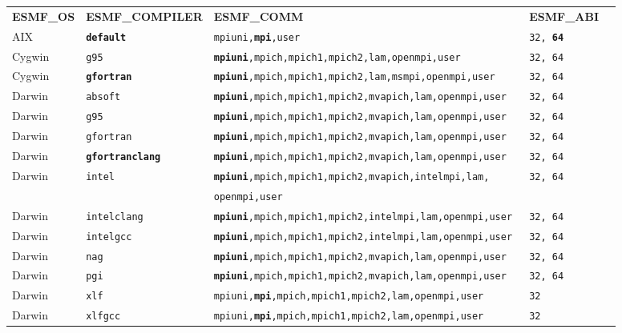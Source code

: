 \begin{longtable}{lllll}
  {\bfseries\footnotesize ESMF\_OS} &{\bfseries\footnotesize ESMF\_COMPILER} & {\bfseries\footnotesize ESMF\_COMM} & {\bfseries\footnotesize ESMF\_ABI} \\

AIX     &\tt {\bf default}        &\footnotesize \tt mpiuni,{\bf mpi},user      &\tt 32, {\bf 64} \\
Cygwin  &\tt g95                  &\footnotesize \tt {\bf mpiuni},mpich,mpich1,mpich2,lam,openmpi,user &\tt 32, 64 \\
Cygwin  &\tt {\bf gfortran}       &\footnotesize \tt {\bf mpiuni},mpich,mpich1,mpich2,lam,msmpi,openmpi,user &\tt 32, 64 \\
Darwin  &\tt absoft               &\footnotesize \tt {\bf mpiuni},mpich,mpich1,mpich2,mvapich,lam,openmpi,user &\tt 32, 64 \\
Darwin  &\tt g95                  &\footnotesize \tt {\bf mpiuni},mpich,mpich1,mpich2,mvapich,lam,openmpi,user &\tt 32, 64 \\
Darwin  &\tt gfortran             &\footnotesize \tt {\bf mpiuni},mpich,mpich1,mpich2,mvapich,lam,openmpi,user &\tt 32, 64 \\
Darwin  &\tt {\bf gfortranclang}  &\footnotesize \tt {\bf mpiuni},mpich,mpich1,mpich2,mvapich,lam,openmpi,user &\tt 32, 64 \\
Darwin  &\tt intel                &\footnotesize \tt {\bf mpiuni},mpich,mpich1,mpich2,mvapich,intelmpi,lam, &\tt 32, 64 \\
        &                         &\footnotesize \tt openmpi,user &  \\
Darwin  &\tt intelclang           &\footnotesize \tt {\bf mpiuni},mpich,mpich1,mpich2,intelmpi,lam,openmpi,user &\tt 32, 64 \\
Darwin  &\tt intelgcc             &\footnotesize \tt {\bf mpiuni},mpich,mpich1,mpich2,intelmpi,lam,openmpi,user &\tt 32, 64 \\
Darwin  &\tt nag                  &\footnotesize \tt {\bf mpiuni},mpich,mpich1,mpich2,mvapich,lam,openmpi,user &\tt 32, 64 \\
Darwin  &\tt pgi                  &\footnotesize \tt {\bf mpiuni},mpich,mpich1,mpich2,mvapich,lam,openmpi,user &\tt 32, 64 \\
Darwin  &\tt xlf                  &\footnotesize \tt mpiuni,{\bf mpi},mpich,mpich1,mpich2,lam,openmpi,user &\tt 32 \\
Darwin  &\tt xlfgcc               &\footnotesize \tt mpiuni,{\bf mpi},mpich,mpich1,mpich2,lam,openmpi,user &\tt 32 \\

\end{longtable}
